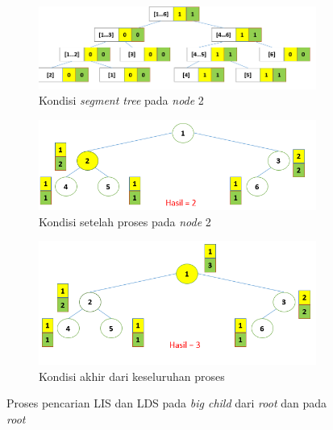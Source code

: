 \begin{figure}[H]
	\begin{subfigure}{1.0\textwidth}
		\centering
		\includegraphics[scale=0.39]{assets/images/Ilustrasi_proses_25.PNG}
		\caption{Kondisi \textit{segment tree} pada \textit{node} 2}
		\label{fig:subproses25}
	\end{subfigure}
	\begin{subfigure}{1.0\textwidth}
		\centering
		\includegraphics[scale=0.39]{assets/images/Ilustrasi_proses_26.PNG}
		\caption{Kondisi setelah proses pada \textit{node} 2}
		\label{fig:subproses26}
	\end{subfigure}
	\begin{subfigure}{1.0\textwidth}
		\centering
		\includegraphics[scale=0.39]{assets/images/Ilustrasi_proses_27.PNG}
		\caption{Kondisi akhir dari keseluruhan proses}
		\label{fig:subproses27}
	\end{subfigure}
	\caption{Proses pencarian LIS dan LDS pada \textit{big child} dari \textit{root} dan pada \textit{root}}
	\label{fig:proses7}
\end{figure}	